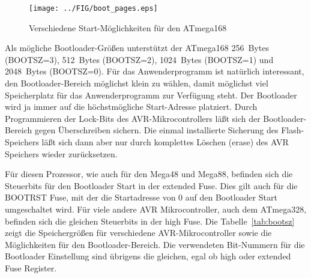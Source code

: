 \begin{figure}[H]
\centering
\texttt{[image: ../FIG/boot\_pages.eps]}
\caption{Verschiedene Start-Möglichkeiten für den ATmega168}
\label{fig:pages}
\end{figure}


Als mögliche Bootloader-Größen unterstützt der ATmega168 256~Bytes (BOOTSZ=3),
512~Bytes (BOOTSZ=2), 1024~Bytes (BOOTSZ=1) und 2048~Bytes (BOOTSZ=0).
Für das Anwenderprogramm ist natürlich interessant, den Bootloader-Bereich
möglichst klein zu wählen, damit möglichst viel Speicherplatz für das
Anwenderprogramm zur Verfügung steht.
Der Bootloader wird ja immer auf die höchstmögliche Start-Adresse platziert.
Durch Programmieren der Lock-Bits des AVR-Mikrocontrollers läßt sich
der Bootloader-Bereich  gegen Überschreiben sichern. Die einmal installierte
Sicherung des Flash-Speichers läßt sich dann aber nur durch komplettes Löschen (erase)
des AVR Speichers wieder zurücksetzen.


Für diesen Prozessor, wie auch für den Mega48 und Mega88, befinden sich
die Steuerbits für den Bootloader Start in der extended Fuse.
Dies gilt auch für die BOOTRST Fuse, mit der die Startadresse von 0
auf den Bootloader Start umgeschaltet wird.
Für viele andere AVR Mikrocontroller, auch dem ATmega328, befinden sich
die gleichen Steuerbits in der high Fuse.
Die Tabelle~\ref{tab:bootsz} zeigt die Speichergrößen für verschiedene
AVR-Mikrocontroller sowie die Möglichkeiten für den Bootloader-Bereich. 
Die verwendeten Bit-Nummern für die Bootloader Einstellung sind übrigens
die gleichen, egal ob high oder extended Fuse Register.

